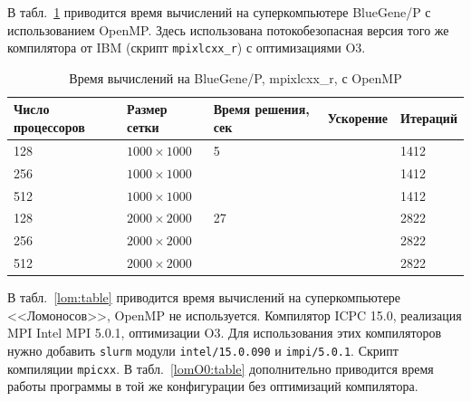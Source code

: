 \documentclass[12pt,notitlepage,oneside]{extarticle}
\begin{document}
В табл.~\ref{bg_omp:table} приводится время вычислений на суперкомпьютере
BlueGene/P с использованием OpenMP. Здесь использована потокобезопасная версия
того же компилятора от IBM (скрипт \texttt{mpixlcxx\_r}) с оптимизациями O3.

\begin{table}[h]
\centering
\caption{Время вычислений на BlueGene/P, mpixlcxx\_r, с OpenMP}
\label{bg_omp:table}
\begin{tabular}{|l|l|l|l|l|}
\textbf{Число процессоров} & \textbf{Размер сетки} & \textbf{Время решения, сек} & \textbf{Ускорение}  & \textbf{Итераций}        \\ \hline
128                        & $1000 \times 1000 $        & 5                      &                     & 1412                     \\
256                        & $1000 \times 1000 $        &                        &                     & 1412                         \\
512                        & $1000 \times 1000 $        &                        &                     & 1412                         \\ \hline
128                        & $2000 \times 2000 $        & 27                     &                     & 2822                     \\
256                        & $2000 \times 2000 $        &                        &                     & 2822                         \\
512                        & $2000 \times 2000 $        &                        &                     & 2822
\end{tabular}
\end{table}

В табл.~\ref{lom:table} приводится время вычислений на суперкомпьютере
<<Ломоносов>>, OpenMP не используется. Компилятор ICPC 15.0, реализация MPI
Intel MPI 5.0.1, оптимизации O3. Для использования этих компиляторов нужно
добавить \texttt{slurm} модули \texttt{intel/15.0.090} и \texttt{impi/5.0.1}.
Скрипт компиляции \texttt{mpicxx}. В табл.~\ref{lomO0:table} дополнительно
приводится время работы программы в той же конфигурации без оптимизаций
компилятора.
\end{document}
